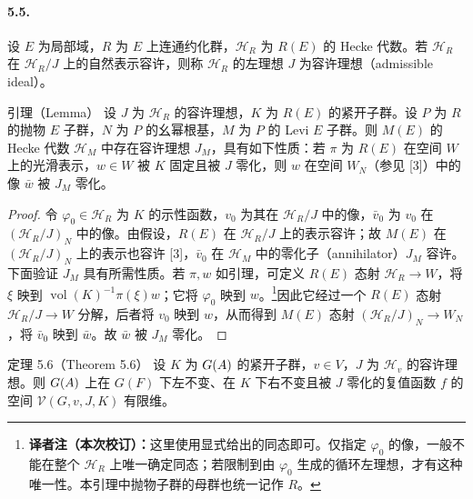 \paragraph*{5.5.}
设 $E$ 为局部域，$R$ 为 $E$ 上连通约化群，$\mathcal H_R$ 为 $R(E)$ 的 Hecke 代数。若 $\mathcal H_R$ 在 $\mathcal H_R/J$ 上的自然表示容许，则称 $\mathcal H_R$ 的左理想 $J$ 为容许理想（admissible ideal）。
\begin{originaltheorem}{引理（Lemma）}
设 $J$ 为 $\mathcal H_R$ 的容许理想，$K$ 为 $R(E)$ 的紧开子群。设 $P$ 为 $R$ 的抛物 $E$ 子群，$N$ 为 $P$ 的幺幂根基，$M$ 为 $P$ 的 Levi $E$ 子群。则 $M(E)$ 的 Hecke 代数 $\mathcal H_M$ 中存在容许理想 $J_M$，具有如下性质：若 $\pi$ 为 $R(E)$ 在空间 $W$ 上的光滑表示，$w\in W$ 被 $K$ 固定且被 $J$ 零化，则 $w$ 在空间 $W_N$（参见 [3]）中的像 $\bar w$ 被 $J_M$ 零化。
\end{originaltheorem}
\begin{proof}
令 $\varphi_0\in\mathcal H_R$ 为 $K$ 的示性函数，$v_0$ 为其在 $\mathcal H_R/J$ 中的像，$\bar v_0$ 为 $v_0$ 在 $(\mathcal H_R/J)_N$ 中的像。由假设，$R(E)$ 在 $\mathcal H_R/J$ 上的表示容许；故 $M(E)$ 在 $(\mathcal H_R/J)_N$ 上的表示也容许 [3]，$\bar v_0$ 在 $\mathcal H_M$ 中的零化子（annihilator）$J_M$ 容许。下面验证 $J_M$ 具有所需性质。若 $\pi,w$ 如引理，可定义 $R(E)$ 态射 $\mathcal H_R\to W$，将 $\xi$ 映到 $\operatorname{vol}(K)^{-1}\pi(\xi)w$；它将 $\varphi_0$ 映到 $w$。\footnote{\textbf{译者注（本次校订）：}这里使用显式给出的同态即可。仅指定 $\varphi_0$ 的像，一般不能在整个 $\mathcal H_R$ 上唯一确定同态；若限制到由 $\varphi_0$ 生成的循环左理想，才有这种唯一性。本引理中抛物子群的母群也统一记作 $R$。}因此它经过一个 $R(E)$ 态射 $\mathcal H_R/J\to W$ 分解，后者将 $v_0$ 映到 $w$，从而得到 $M(E)$ 态射 $(\mathcal H_R/J)_N\to W_N$，将 $\bar v_0$ 映到 $\bar w$。故 $\bar w$ 被 $J_M$ 零化。
\end{proof}
\begin{originaltheorem}{定理 5.6（Theorem 5.6）}
设 $K$ 为 $G(A)$ 的紧开子群，$v\in V$，$J$ 为 $\mathcal H_v$ 的容许理想。则 $G(A)$ 上在 $G(F)$ 下左不变、在 $K$ 下右不变且被 $J$ 零化的复值函数 $f$ 的空间 $\mathcal V(G,v,J,K)$ 有限维。
\end{originaltheorem}
